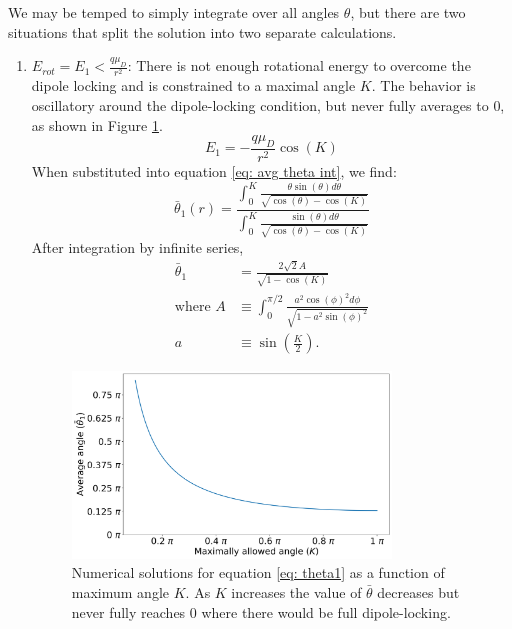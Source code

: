 We may be temped to simply integrate over all angles $\theta$, but there are two situations that split the solution into two separate calculations.
\begin{enumerate}
	\item $E_{rot} = E_1 < \frac{q \mu_D}{r^2}$:
	There is not enough rotational energy to overcome the dipole locking and is constrained to a maximal angle $K$. The behavior is oscillatory around the dipole-locking condition, but never fully averages to 0, as shown in Figure \ref{fig: theta1}.
	\begin{equation*}
		E_1=-\frac{q \mu_D}{r^2}\cos(K)
	\end{equation*}
	When substituted into equation \ref{eq: avg theta int}, we find:
	\begin{equation}
	    \bar{\theta}_1(r) = \dfrac{\displaystyle\int_0^K \frac{\theta \sin(\theta) d \theta}{\sqrt{\cos(\theta) - \cos(K)}}}{\displaystyle\int_0^K \frac{\sin(\theta) d \theta}{\sqrt{\cos(\theta) - \cos(K)}}} \label{eq: theta1}
	\end{equation}
	After integration by infinite series,
	\begin{align*}
	    \bar{\theta}_1 & = \frac{2 \sqrt{2}A}{\sqrt{1-\cos(K)}} \\
	    \text{where }A & \equiv \int_0^{\pi/2} \frac{a^2 \cos(\phi)^2 d\phi}{\sqrt{1-a^2 \sin(\phi)^2}} \\
	    a & \equiv \sin\left(\frac{K}{2}\right).
	\end{align*}
	\begin{figure}[H]
		\label{fig: theta1}
		\centering
		\includegraphics[width=0.8\textwidth]{images/ADO_theta1.png}
		\caption{Numerical solutions for equation \ref{eq: theta1} as a function of maximum angle $K$. As $K$ increases the value of $\bar{\theta}$ decreases but never fully reaches 0 where there would be full dipole-locking.}
	\end{figure}


\end{enumerate}
